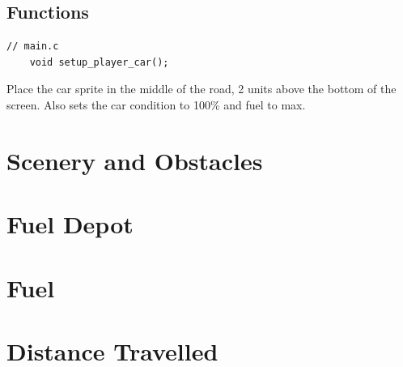 \documentclass{article}
\begin{document}
\subsection*{Functions}
\begin{lstlisting}[style=CStyle]
	// main.c
	void setup_player_car();
\end{lstlisting}
Place the car sprite in the middle of the road, 2 units above the bottom of the screen. Also sets the car condition to 100\% and fuel to max.

\clearpage

\section{Scenery and Obstacles}

\clearpage

\section{Fuel Depot}

\clearpage

\section{Fuel}

\clearpage


\section{Distance Travelled}

\clearpage


\end{document}
